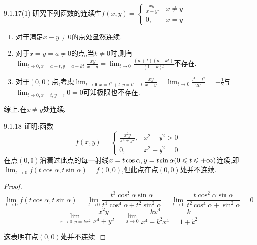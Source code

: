 \begin{exercise}{9.1.17(1)}
    研究下列函数的连续性$f(x,y)=\begin{cases}
        \frac{xy}{x-y},&x\neq y\\
        0,&x=y
    \end{cases}$
\end{exercise}
\begin{solution}
    \begin{enumerate}
        \item 对于满足$x-y\neq0$的点处显然连续.
        \item 对于$x=y=a\neq0$的点,当$k\neq0$时,则有$\lim_{t\to 0,x=a+t,y=a+kt
        }\frac{xy}{x-y}=\lim_{t\to 0}\frac{(a+t)(a+kt)}{(1-k)t}$不存在.
        \item 对于$(0,0)$点,考虑$\lim_{t\to 0,x=t^2+t,y=t^2-t}\frac{xy}{x-y}=\lim_{t\to 0}\frac{t^4-t^2}{2t^2}=-\frac{1}{2}$与
        $\lim_{t\to 0,x=t,y=t}0=0$可知极限也不存在.
    \end{enumerate}

    综上,在$x\neq y$处连续.
\end{solution}

\begin{exercise}{9.1.18}
    证明:函数$$f(x,y)=\begin{cases}
        \frac{x^2y}{x^4+y^2},&x^2+y^2>0\\
        0,&x^2+y^2=0
    \end{cases}$$
    在点$(0,0)$沿着过此点的每一射线$x=t\cos\alpha,y=t\sin\alpha(0\leqslant t\leqslant+\infty)$连续,即$\lim_{t\to 0}f(t\cos\alpha,t\sin\alpha)=f(0,0)$,但此点在点$(0,0)$处并不连续.
\end{exercise}
\begin{proof}
    $$\lim_{t\to 0}f(t\cos\alpha,t\sin\alpha)=\lim_{t\to 0}\frac{t^3\cos^2\alpha\sin\alpha}{t^4\cos^4\alpha+t^2\sin^2\alpha}=
    \lim_{t\to 0}\frac{t\cos^2\alpha\sin\alpha}{t^2\cos^4\alpha+\sin^2\alpha}=0$$
    $$\lim_{x\to 0,y=kx^2}\frac{x^2y}{x^4+y^2}=\lim_{x\to 0}\frac{kx^4}{x^4+k^2x^4}=\frac{k}{1+k^2}$$
    
    这表明在点$(0,0)$处并不连续.
\end{proof}